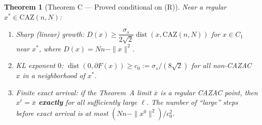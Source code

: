 \documentclass[11pt]{article}
\theoremstyle{plain}
\newtheorem{theorem}{Theorem}[section]
\theoremstyle{definition}
\theoremstyle{remark}
\newcommand{\CAZ}{\mathrm{CAZ}}
\newcommand{\dist}{\operatorname{dist}}
\begin{document}
\begin{theorem}[Theorem C --- Proved conditional on (R)]\label{thm:C}
Near a regular $x^*\in\CAZ(n,N)$:
\begin{enumerate}
\item[\rm(a)] \emph{Sharp (linear) growth:}
$D(x)\ge\dfrac{\sigma_s}{2\sqrt2}\dist(x,\CAZ(n,N))$ for $x\in C_1$ near
$x^*$, where $D(x)=Nn-\|x\|^2$.
\item[\rm(b)] \emph{KL exponent $0$:}
$\dist(0,\partial F(x))\ge c_0:=\sigma_s/(8\sqrt2)$ for all non-CAZAC $x$
in a neighborhood of $x^*$.
\item[\rm(c)] \emph{Finite exact arrival:} if the Theorem~A limit $\bar x$
is a regular CAZAC point, then $x^\ell=\bar x$ \textbf{exactly} for all
sufficiently large $\ell$. The number of ``large'' steps before exact
arrival is at most $(Nn-\|x^0\|^2)/c_0^2$.
\end{enumerate}
\end{theorem}
\end{document}
